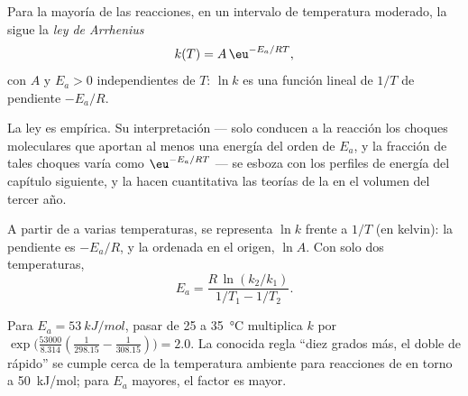 \begin{theorem}\label{thm:b1:rate-laws:arrhenius}
Para la mayoría de las reacciones, en un intervalo de temperatura
moderado, la  sigue la \emph{ley de
Arrhenius}
\[
  k(T) = A\,\eu^{-E_a/RT} ,
\]
con $A$ y $E_a > 0$ independientes de $T$: $\ln k$ es una función lineal
de $1/T$ de pendiente $-E_a/R$.
\end{theorem}
\admitted

\begin{remark}[El significado de $E_a$]\label{rem:b1:rate-laws:meaning}
La ley es empírica. Su interpretación --- solo conducen a la reacción los
choques moleculares que aportan al menos una energía del orden de $E_a$,
y la fracción de tales choques varía como $\eu^{-E_a/RT}$ --- se esboza
con los perfiles de energía del capítulo siguiente, y la hacen
cuantitativa las teorías de la  en el volumen del
tercer año.
\end{remark}

\begin{method}[Determinar $E_a$]\label{met:b1:rate-laws:arrhenius-plot}
A partir de  a varias temperaturas, se representa
$\ln k$ frente a $1/T$ (en kelvin): la pendiente es $-E_a/R$, y la
ordenada en el origen, $\ln A$. Con solo dos temperaturas,
\[
  E_a = \frac{R\,\ln(k_2/k_1)}{1/T_1 - 1/T_2} .
\]
\end{method}

\begin{example}\label{ex:b1:rate-laws:doubling}
Para $E_a = \qty{53}{kJ/mol}$, pasar de 25 a \qty{35}{\celsius} multiplica
$k$ por $\exp\!\big(\frac{53000}{8.314}(\frac{1}{298.15} -
\frac{1}{308.15})\big) = 2.0$. La conocida regla ``diez grados más, el
doble de rápido'' se cumple cerca de la temperatura ambiente para
reacciones de  en torno a \qty{50}{kJ/mol}; para
$E_a$ mayores, el factor es mayor.
\end{example}

